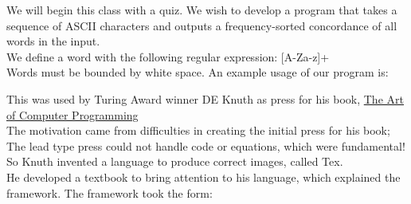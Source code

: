 \documentclass[../../lecture_notes.tex]{subfiles}
\begin{document}
\noindent We will begin this class with a quiz.  
We wish to develop a program that takes a sequence of ASCII characters 
	and outputs a frequency-sorted concordance of all words in the input.\\
We define a word with the following regular expression: [A-Za-z]+ \\
Words must be bounded by white space.
An example usage of our program is:
\begin{center}\end{center}

\noindent This was used by Turing Award winner DE Knuth as press for his book, 
	\underline{The Art of Computer Programming} \\
The motivation came from difficulties in creating the initial press for his book;\\
	\indent The lead type press could not handle code or equations, which were fundamental! \\
So Knuth invented a language to produce correct images, called Tex. \\
He developed a textbook to bring attention to his language, which explained the framework.
The framework took the form:
\begin{center}\end{center}
\end{document}
